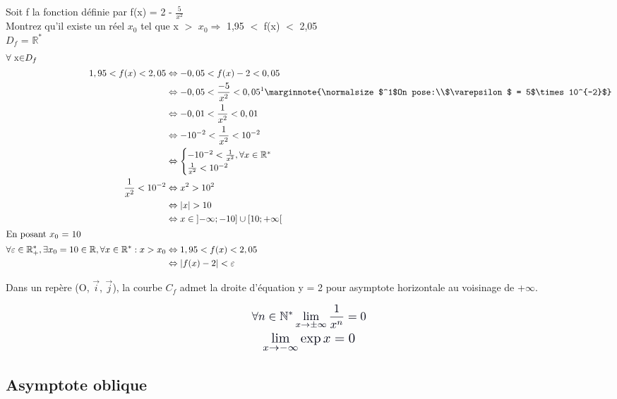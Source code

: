 \documentclass[a4paper]{article}
\renewcommand{\large}{\color{text}}
\renewcommand{\textbf}{\color{crimson}}
\begin{document}
	\bigskip
	\textbf{\color{darkblue}Exemple:}
	\large Soit f la fonction définie par f(x) = 2 - $\frac{5}{x^2}$\\
	Montrez qu'il existe un réel $x_0$ tel que x $>$ $x_0 \Rightarrow$ 1,95 $<$ f(x) $<$ 2,05\\
	\newline
	$D_f$ = $\mathbb{R}^*$
	\begin{gather*}
		\begin{split}
			\shortintertext{$\forall$ x$\in$$D_f$}
			1,95 < f(x) < 2,05 &\Leftrightarrow -0,05 < f(x) - 2 < 0,05\\
			&\Leftrightarrow-0,05 < \frac{-5}{x^2} < 0,05^1
			\marginnote{\normalsize $^1$On pose:\\$\varepsilon$ = 5$\times10^{-2}$}
			\\
			&\Leftrightarrow-0,01 < \frac{1}{x^2} < 0,01\\
			&\Leftrightarrow -10^{-2} < \frac{1}{x^2}< 10^{-2}\\
			&\Leftrightarrow
			\begin{cases}
				-10^{-2} < \frac{1}{x^2}, \forall x\in\mathbb{R}^*\\
				\frac{1}{x^2} < 10^{-2}
			\end{cases}
			\\
			\frac{1}{x^2} < 10^{-2}&\Leftrightarrow x^2 > 10^2\\
			&\Leftrightarrow\lvert x\rvert > 10\\
			&\Leftrightarrow x\in \left]-\infty; -10\right] \cup \left[10; +\infty\right[\\
			\shortintertext{En posant $x_0$ = 10}
			\forall\varepsilon\in\mathbb{R}_{+}^{*},\exists x_0=10\in\mathbb{R},\forall x\in\mathbb{R}^*: x>x_0 &\Leftrightarrow 1,95 < f(x) < 2,05\\
			&\Leftrightarrow\lvert f(x) - 2\rvert < \varepsilon
		\end{split}
	\end{gather*}

	\textbf{Graph:}
	\large Dans un repère (O, $\vec{i}$, $\vec{j}$), la courbe $C_f$ admet la droite d'équation y = 2 pour asymptote horizontale au voisinage de +$\infty$.
	\vspace{0.8cm}
	
	\textbf{Propriétés:}
	\begin{gather}
		\color{text} \scaleto{\forall n\in\mathbb{N}^*\lim_{x\to\pm\infty}\frac{1}{x^n}=0}{25pt}\\
		\color{text} \scaleto{\lim_{x\to-\infty}\exp{x}=0}{20pt}
	\end{gather}
	\newpage

	\begin{center}
		\subsection*{Asymptote oblique}
	\end{center}

	
\end{document}
